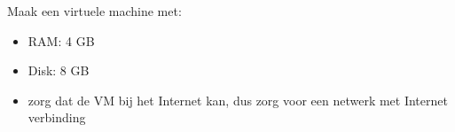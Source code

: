 Maak een virtuele machine met:
\begin{itemize}
\item RAM: 4 GB
\item Disk: 8 GB
\item zorg dat de VM bij het Internet kan, dus zorg voor een netwerk met Internet verbinding
\end{itemize}

